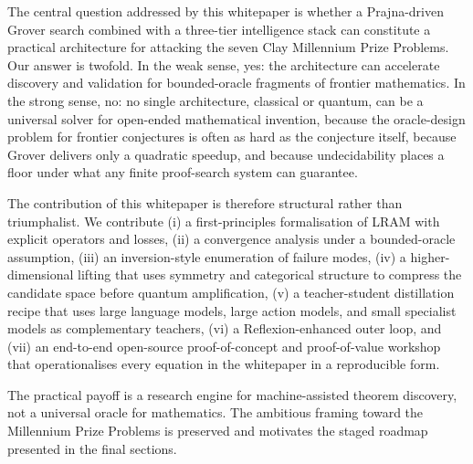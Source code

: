 The central question addressed by this whitepaper is whether a Prajna-driven Grover search combined with a three-tier intelligence stack can constitute a practical architecture for attacking the seven Clay Millennium Prize Problems. Our answer is twofold. In the weak sense, yes: the architecture can accelerate discovery and validation for bounded-oracle fragments of frontier mathematics. In the strong sense, no: no single architecture, classical or quantum, can be a universal solver for open-ended mathematical invention, because the oracle-design problem for frontier conjectures is often as hard as the conjecture itself, because Grover delivers only a quadratic speedup, and because undecidability places a floor under what any finite proof-search system can guarantee.

The contribution of this whitepaper is therefore structural rather than triumphalist. We contribute (i) a first-principles formalisation of LRAM with explicit operators and losses, (ii) a convergence analysis under a bounded-oracle assumption, (iii) an inversion-style enumeration of failure modes, (iv) a higher-dimensional lifting that uses symmetry and categorical structure to compress the candidate space before quantum amplification, (v) a teacher-student distillation recipe that uses large language models, large action models, and small specialist models as complementary teachers, (vi) a Reflexion-enhanced outer loop, and (vii) an end-to-end open-source proof-of-concept and proof-of-value workshop that operationalises every equation in the whitepaper in a reproducible form.

The practical payoff is a research engine for machine-assisted theorem discovery, not a universal oracle for mathematics. The ambitious framing toward the Millennium Prize Problems is preserved and motivates the staged roadmap presented in the final sections.
